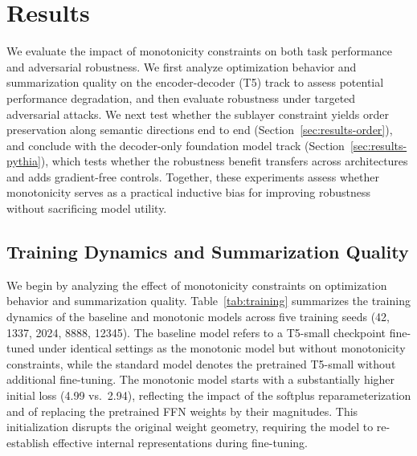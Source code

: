 \documentclass{article}
\theoremstyle{plain}
\theoremstyle{definition}
\theoremstyle{remark}
\begin{document}
\section{Results}
\label{sec:results}
We evaluate the impact of monotonicity constraints on both task performance and adversarial robustness. We first analyze optimization behavior and summarization quality on the encoder-decoder (T5) track to assess potential performance degradation, and then evaluate robustness under targeted adversarial attacks. We next test whether the sublayer constraint yields order preservation along semantic directions end to end (Section~\ref{sec:results-order}), and conclude with the decoder-only foundation model track (Section~\ref{sec:results-pythia}), which tests whether the robustness benefit transfers across architectures and adds gradient-free controls. Together, these experiments assess whether monotonicity serves as a practical inductive bias for improving robustness without sacrificing model utility.


\subsection{Training Dynamics and Summarization Quality}

We begin by analyzing the effect of monotonicity constraints on optimization behavior and summarization quality. Table~\ref{tab:training} summarizes the training dynamics of the baseline and monotonic models across five training seeds (42, 1337, 2024, 8888, 12345). The baseline model refers to a T5-small checkpoint fine-tuned under identical settings as the monotonic model but without monotonicity constraints, while the standard model denotes the pretrained T5-small without additional fine-tuning. The monotonic model starts with a substantially higher initial loss (4.99 vs.\ 2.94), reflecting the impact of the softplus reparameterization and of replacing the pretrained FFN weights by their magnitudes. This initialization disrupts the original weight geometry, requiring the model to re-establish effective internal representations during fine-tuning.
\end{document}

